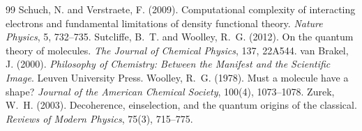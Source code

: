 \documentclass{situationist-preprint}
\begin{document}
\begin{thebibliography}{99}
 Schuch, N. and Verstraete, F. (2009). Computational complexity of interacting electrons and fundamental limitations of density functional theory. \emph{Nature Physics}, 5, 732--735.
 Sutcliffe, B.~T. and Woolley, R.~G. (2012). On the quantum theory of molecules. \emph{The Journal of Chemical Physics}, 137, 22A544.
 van Brakel, J. (2000). \emph{Philosophy of Chemistry: Between the Manifest and the Scientific Image}. Leuven University Press.
 Woolley, R.~G. (1978). Must a molecule have a shape? \emph{Journal of the American Chemical Society}, 100(4), 1073--1078.
 Zurek, W.~H. (2003). Decoherence, einselection, and the quantum origins of the classical. \emph{Reviews of Modern Physics}, 75(3), 715--775.
\end{thebibliography}
\end{document}
